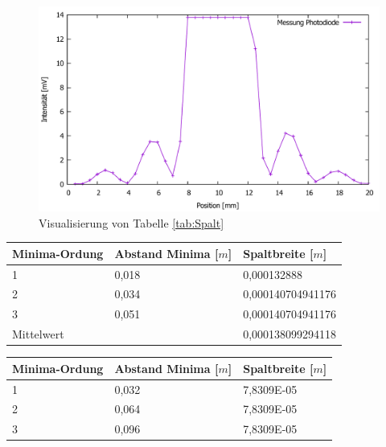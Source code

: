 \documentclass{scrartcl}
\begin{document}
\begin{figure}[H]
  \centering
    \includegraphics[width=\textwidth]{V4_Photodiode.pdf}
  \caption{Visualisierung von Tabelle \ref{tab:Spalt}}
  \label{fig:Spalt}
\end{figure}
\begin{table}[H]
\begin{center}
\begin{tabular}{l|l|l}
Minima-Ordung	& Abstand Minima [$m$] & Spaltbreite [$m$]  \\
\hline

1	&0,018	&0,000132888\\
2	&0,034	&0,000140704941176\\
3	&0,051	&0,000140704941176\\
\hline
Mittelwert		&&0,000138099294118\\
\end{tabular}
\end{center}
\label{tab:Spalt_Auswertung}
\end{table}
\begin{table}[H]
\begin{center}
\begin{tabular}{l|l|l}
Minima-Ordung	& Abstand Minima [$m$] & Spaltbreite [$m$]  \\
\hline

1&	0,032&	7,8309E-05\\
2&	0,064&	7,8309E-05\\
3&	0,096&	7,8309E-05\\

\end{tabular}
\end{center}
\label{tab:Spalt_Auswertung_Haar}
\end{table}
\end{document}
